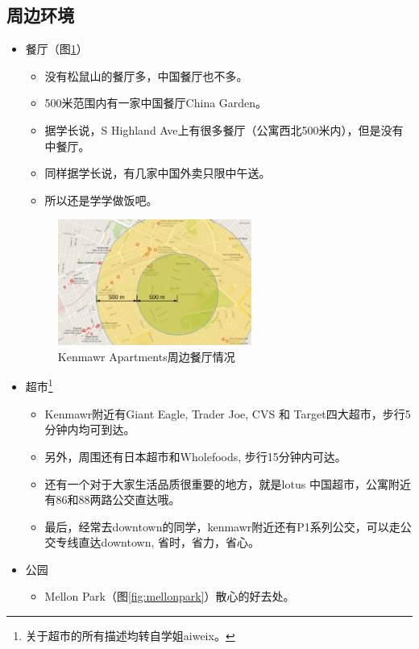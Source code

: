 \documentclass[nofonts,a4paper,11pt]{article}
\begin{document}
\subsection{周边环境}

\begin{itemize}
	\item 餐厅（图\ref{fig:resteraunt}）
	\begin{itemize}
		\item 没有松鼠山的餐厅多，中国餐厅也不多。
		\item 500米范围内有一家中国餐厅China Garden。
		\item 据学长说，S Highland Ave上有很多餐厅（公寓西北500米内），但是没有中餐厅。
		\item 同样据学长说，有几家中国外卖只限中午送。
		\item 所以还是学学做饭吧。
	\end{itemize}
	\begin{figure}[!htb]
		\centering
		\includegraphics[width=0.6\textwidth]{./img/resteraunt}
		\caption{Kenmawr Apartments周边餐厅情况}
		\label{fig:resteraunt}
	\end{figure}
	\item 超市\footnote{关于超市的所有描述均转自学姐aiweix。}
	\begin{itemize}
		\item Kenmawr附近有Giant Eagle, Trader Joe, CVS 和 Target四大超市，步行5分钟内均可到达。
		\item 另外，周围还有日本超市和Wholefoods, 步行15分钟内可达。
		\item 还有一个对于大家生活品质很重要的地方，就是lotus 中国超市，公寓附近有86和88两路公交直达哦。
		\item 最后，经常去downtown的同学，kenmawr附近还有P1系列公交，可以走公交专线直达downtown, 省时，省力，省心。
	\end{itemize}
	\item 公园
	\begin{itemize}
		\item Mellon Park（图\ref{fig:mellonpark}）散心的好去处。

\end{itemize}
\end{itemize}
\end{document}
